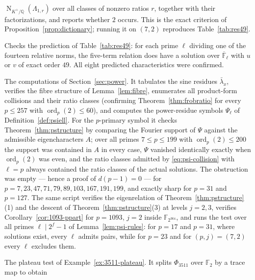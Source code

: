 \documentclass[a4paper]{article}
\newcommand{\F}{\mathbb{F}}
\newcommand{\Q}{\mathbb{Q}}
\newcommand{\ord}[2][]{\operatorname{ord}_{#1}\!\left(#2\right)}
\DeclareMathOperator{\Nm}{N}
\begin{document}
\begin{description}
	      $\Nm_{K^{+}/\Q}(\Lambda_{1,r})$ over all classes of nonzero
	      ratios $r$, together with their factorizations, and reports
	      whether $2$ occurs.
	      This is the exact criterion of
	      Proposition~\ref{prop:dictionary}; running it on $(7,2)$
	      reproduces Table~\ref{tab:res49}.
	\item[\path{code/ai_prototypes/verify_p7_characteristics.py}]
	      Checks the prediction of Table~\ref{tab:res49}: for each prime
	      $\ell$ dividing one of the fourteen relative norms, the five-term
	      relation does have a solution over $\overline{\F}_\ell$ with $u$
	      or $v$ of exact order $49$.
	      All eight predicted characteristics were confirmed.
	\item[\path{code/ai_prototypes/sine_unit_obstruction.py}]
	      The computations of Section~\ref{sec:power}.
	      It tabulates the sine residues $\bar\lambda_x$, verifies the
	      fibre structure of Lemma~\ref{lem:fibre}, enumerates all
	      product-form collisions and their ratio classes (confirming
	      Theorem~\ref{thm:frobratio} for every $p\leq257$ with
	      $\ord[p]{2}\leq60$), and computes the power-residue symbols
	      $\Psi_\ell$ of Definition~\ref{def:psiell}.
	      For the $p$-primary symbol it checks
	      Theorem~\ref{thm:pstructure} by comparing the Fourier support of
	      $\Psi$ against the admissible eigencharacters $A$; over all
	      primes $7\leq p\leq199$ with $\ord[p]{2}\leq200$ the support was
	      contained in $A$ in every case, $\Psi$ vanished identically
	      exactly when $\ord[p]{2}$ was even, and the ratio classes
	      admitted by \eqref{eq:psi-collision} with $\ell=p$ always
	      contained the ratio classes of the actual solutions.
	      The obstruction was empty --- hence a proof of $d(p-1)=0$ ---
	      for $p=7,23,47,71,79,89,103,167,191,199$, and exactly sharp for
	      $p=31$ and $p=127$.
	      The same script verifies the eigenrelation of
	      Theorem~\ref{thm:pstructure}(1) and the descent of
	      Theorem~\ref{thm:pstructure}(3) at levels $j=2,3$, verifies
	      Corollary~\ref{cor:1093-ppart} for $p=1093$, $j=2$ inside
	      $\F_{2^{364}}$, and runs the test over all primes
	      $\ell\mid2^{f}-1$ of Lemma~\ref{lem:psi-rules}: for $p=17$ and
	      $p=31$, where solutions exist, every $\ell$ admits pairs, while
	      for $p=23$ and for $(p,j)=(7,2)$ every $\ell$ excludes them.
	\item[\path{code/ai_prototypes/plateau_ppart_3511.py}]
	      The plateau test of Example~\ref{ex:3511-plateau}.
	      It splits $\Phi_{3511}$ over $\F_2$ by a trace map to obtain

\end{description}
\end{document}
